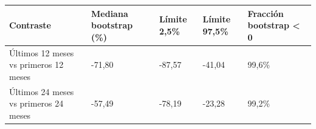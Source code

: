 \begin{tabular}{lllll}
\toprule
Contraste & Mediana bootstrap (\%) & Límite 2,5\% & Límite 97,5\% & Fracción bootstrap < 0 \\
\midrule
Últimos 12 meses vs primeros 12 meses & -71,80 & -87,57 & -41,04 & 99,6\% \\
Últimos 24 meses vs primeros 24 meses & -57,49 & -78,19 & -23,28 & 99,2\% \\
\bottomrule
\end{tabular}
